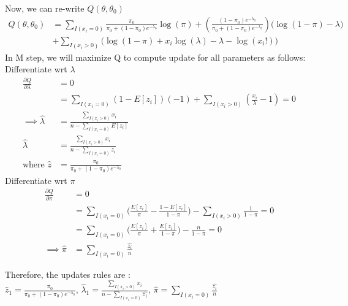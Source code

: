 \documentclass[10pt,letterpaper]{article}
\begin{document}
Now, we can re-write $Q(\theta, \theta_0)$
\begin{align*}
Q(\theta, \theta_0) &= \sum_{I(x_i=0)} \frac{\pi_0}{\pi_0+(1-\pi_0)e^{-\lambda_0}} \log(\pi) + (\frac{(1-\pi_0)e^{-\lambda_0}}{\pi_0+(1-\pi_0)e^{-\lambda_0}}) \big( \log(1-\pi) - \lambda \big)\\  
&+ \sum_{I(x_i>0)} \big( \log(1-\pi) + x_i \log(\lambda) - \lambda - \log(x_i!) \big)
\end{align*}
In M step, we will maximize Q to compute update for all parameters as follows:
Differentiate wrt $\lambda$
\begin{align*}
\frac{\partial Q}{\partial \lambda} &=0\\
&= \sum_{I(x_i=0)} (1-E[z_i])(-1) + \sum_{I(x_i>0)} (\frac{x_i}{\lambda}-1)  =0\\
\implies \hat{\lambda} &= \frac{\sum_{I(x_i>0)}x_i}{n-\sum_{I(x_i=0)}E[z_i]} \\
\hat{\lambda}  &= \frac{\sum_{I(x_i>0)}x_i}{n-\sum_{I(x_i=0)}\hat{z_i}} \\
\text{where } \hat{z} &= \frac{\pi_0}{\pi_0+(1-\pi_0)e^{-\lambda_0}}
\end{align*}
Differentiate wrt $\pi$		
\begin{align*}
\frac{\partial Q}{\partial \pi} &=0\\
&=  \sum_{I(x_i=0)} \big(\frac{E[z_i]}{\pi} - \frac{1-E[z_i]}{1-\pi}\big) - \sum_{I(x_i>0)}  \frac{1}{1-\pi} =0 \\
&= \sum_{I(x_i=0)} \big(\frac{E[z_i]}{\pi} + \frac{E[z_i]}{1-\pi}\big) - \frac{n}{1-\pi} = 0\\
\implies \hat{\pi} &= \sum_{I(x_i=0)} \frac{\hat{z_i}}{n}
\end{align*}

Therefore, the updates rules are :\\
$\hat{z}_1 = \frac{\pi_0}{\pi_0+(1-\pi_0)e^{-\lambda_0}}$, 
$\hat{\lambda}_1 = \frac{\sum_{I(x_i>0)}x_i}{n-\sum_{I(x_i=0)}\hat{z_1}}$,   
$\hat{\pi} = \sum_{I(x_i=0)} \frac{\hat{z_i}}{n}$
			
\end{document}
